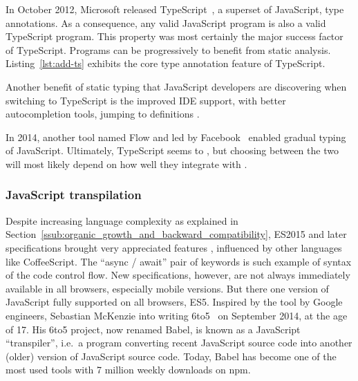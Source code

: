 In October 2012, Microsoft released TypeScript~\cite{bierman2014understanding},
a superset of JavaScript,    type annotations.
As a consequence, any valid JavaScript program is also a valid TypeScript program.
This property was most certainly the major success factor of TypeScript.
Programs can be  progressively to benefit from static analysis.
Listing~\ref{lst:add-ts} exhibits the core type annotation feature of TypeScript.



Another benefit of static typing that JavaScript developers are discovering when
switching to TypeScript is the improved IDE support,
with  better autocompletion tools, jumping to definitions .

In 2014, another tool named Flow and led by Facebook~\cite{chaudhuri2017fast}
enabled gradual typing of JavaScript.
Ultimately, TypeScript seems to ,
but choosing between the two will most likely depend on how well they integrate
with .

\subsubsection{JavaScript transpilation}%
\label{ssub:javascript_transpilation}

Despite increasing language complexity
as explained in Section~\ref{ssub:organic_growth_and_backward_compatibility},
ES2015 and later specifications brought very appreciated  features ,
 influenced by other languages like CoffeeScript.
The ``async / await'' pair of keywords is such example of syntax
 of the code control flow.
New specifications, however, are not always immediately available in all browsers,
especially mobile versions.
But there  one version of JavaScript fully supported on all browsers, ES5.
Inspired by the  tool by Google engineers,
Sebastian McKenzie  into writing 6to5~\cite{babel}
on September 2014, at the age of 17.
His 6to5 project, now renamed Babel, is known as a JavaScript ``transpiler'',
i.e.\ a program converting recent JavaScript source code into another (older) version
of JavaScript source code.
Today, Babel has become one of the most used tools
with 7 million weekly downloads on npm.


